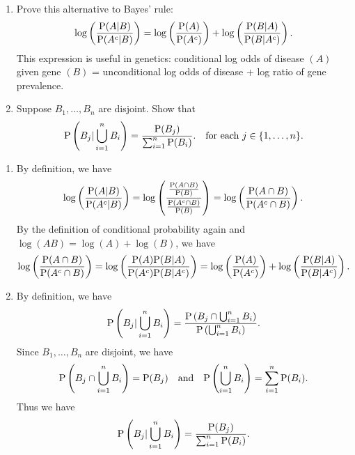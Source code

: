 \documentclass[12pt]{article}
\newcommand{\Prob}{{\rm P}}
\newenvironment{problem}[2][Problem]{\begin{trivlist}
\item[\hskip \labelsep {\bfseries #1}\hskip \labelsep {\bfseries #2.}]}
{\end{trivlist}}
\begin{document}
\begin{problem}{2}
  \begin{enumerate}
    \item Prove this alternative to Bayes' rule:
    \[
      \log\left(\frac{\Prob(A|B)}{\Prob(A^c|B)}\right)
      = \log\left(\frac{\Prob(A)}{\Prob(A^c)}\right)
      + \log\left(\frac{\Prob(B|A)}{\Prob(B|A^c)}\right).
    \]
    This expression is useful in genetics: conditional log odds of disease
    $(A)$ given gene $(B)$ = unconditional log odds of disease + log ratio
    of gene prevalence.
    \item Suppose $B_1,\dots,B_n$ are disjoint. Show that
    \[
      \Prob\left(B_j|\bigcup_{i=1}^n B_i\right) = \frac{\Prob(B_j)}
      {\sum_{i=1}^n \Prob(B_i)}. \quad \text{for each } j \in \{1,\dots,n\}.
    \]
  \end{enumerate}
  \begin{enumerate}
    \item By definition, we have
    \[
      \log\left(\frac{\Prob(A|B)}{\Prob(A^c|B)}\right)
      = \log\left(\frac{\frac{\Prob(A\cap B)}{\Prob(B)}}
      {\frac{\Prob(A^c\cap B)}{\Prob(B)}}\right)
      = \log\left(\frac{\Prob(A\cap B)}{\Prob(A^c\cap B)}\right).
    \]
    By the definition of conditional probability again and
    $\log(AB) = \log(A)+\log(B)$, we have
    \[
      \log\left(\frac{\Prob(A\cap B)}{\Prob(A^c\cap B)}\right)
      = \log\left(\frac{\Prob(A)\Prob(B|A)}{\Prob(A^c)\Prob(B|A^c)}\right)
      = \log\left(\frac{\Prob(A)}{\Prob(A^c)}\right)
      + \log\left(\frac{\Prob(B|A)}{\Prob(B|A^c)}\right).
    \]
    \item By definition, we have
    \[
      \Prob\left(B_j|\bigcup_{i=1}^n B_i\right)
      = \frac{\Prob\left(B_j \cap \bigcup_{i=1}^n B_i\right)}
      {\Prob\left(\bigcup_{i=1}^n B_i\right)}.
    \]
    Since $B_1,\dots,B_n$ are disjoint, we have
    \[
      \Prob\left(B_j \cap \bigcup_{i=1}^n B_i\right)
      = \Prob(B_j) \quad \text{and} \quad
      \Prob\left(\bigcup_{i=1}^n B_i\right)
      = \sum_{i=1}^n \Prob(B_i).
    \]
    Thus we have
    \[
      \Prob\left(B_j|\bigcup_{i=1}^n B_i\right)
      = \frac{\Prob(B_j)}{\sum_{i=1}^n \Prob(B_i)}.
    \]
  \end{enumerate}
\end{problem}
\end{document}
